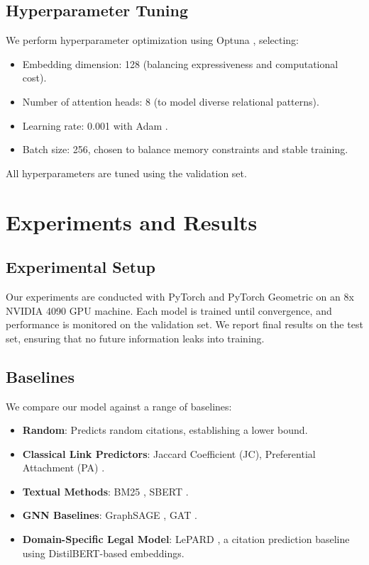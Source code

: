 \documentclass{article}
\begin{document}
\subsection{Hyperparameter Tuning}
We perform hyperparameter optimization using Optuna \citep{akiba2019optuna}, selecting:
\begin{itemize}[leftmargin=*]
    \item Embedding dimension: 128 (balancing expressiveness and computational cost).
    \item Number of attention heads: 8 (to model diverse relational patterns).
    \item Learning rate: 0.001 with Adam \citep{kingma2017adam}.
    \item Batch size: 256, chosen to balance memory constraints and stable training.
\end{itemize}

All hyperparameters are tuned using the validation set.

\section{Experiments and Results}
\subsection{Experimental Setup}
Our experiments are conducted with PyTorch and PyTorch Geometric \citep{fey2019fast} on an 8x NVIDIA 4090 GPU machine. Each model is trained until convergence, and performance is monitored on the validation set. We report final results on the test set, ensuring that no future information leaks into training.

\subsection{Baselines}
We compare our model against a range of baselines:

\begin{itemize}[leftmargin=*]
    \item \textbf{Random}: Predicts random citations, establishing a lower bound.
    \item \textbf{Classical Link Predictors}: Jaccard Coefficient (JC), Preferential Attachment (PA) \citep{liben2007link}.
    \item \textbf{Textual Methods}: BM25 \citep{robertson2009probabilistic}, SBERT \citep{reimers2019sentence}.
    \item \textbf{GNN Baselines}: GraphSAGE \citep{hamilton2018inductive}, GAT \citep{velivckovic2018graph}.
    \item \textbf{Domain-Specific Legal Model}: LePARD \citep{mahari2022lepard}, a citation prediction baseline using DistilBERT-based embeddings.
\end{itemize}
\end{document}
